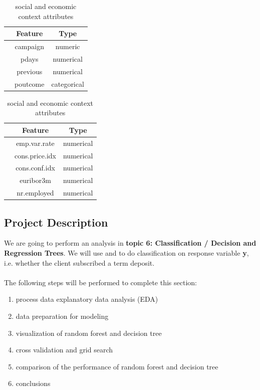 \documentclass[11pt,a4paper]{article}
\newcounter{magicrownumbers}
\newcommand\rownumber{\stepcounter{magicrownumbers}\arabic{magicrownumbers}}
\begin{document}
    \begin{table}[h]
        \begin{minipage}{.5\linewidth}
            \centering
            \begin{tabular}{r c c}
                 & Feature & Type \\
                \hline \hline
                \rownumber & campaign & numeric \\
                \rownumber & pdays & numerical \\
                \rownumber & previous & numerical \\
                \rownumber & poutcome & categorical \\
            \end{tabular}
            \caption{Other attributes}\label{tab:other}
        \end{minipage}%
        \begin{minipage}{.5\linewidth}
            \centering
            \begin{tabular}{r c c}
                 & Feature & Type \\
                \hline \hline
                \rownumber & emp.var.rate & numerical \\
                \rownumber & cons.price.idx & numerical \\
                \rownumber & cons.conf.idx & numerical \\
                \rownumber & euribor3m & numerical \\
                \rownumber & nr.employed & numerical \\
            \end{tabular}
            \caption{social and economic context attributes}\label{tab:soc.econ}
        \end{minipage}
    \end{table}
    
    \subsection{Project Description}
    We are going to perform an analysis in \textbf{topic 6: Classification / Decision and Regression Trees}. We will use  and  to do classification on response variable \textbf{y}, i.e. whether the client subscribed a term deposit. \\
    \\
    The following steps will be performed to complete this section:
    \begin{enumerate}
        \item process data explanatory data analysis (EDA)
        \item data preparation for modeling
        \item visualization of random forest and decision tree
        \item cross validation and grid search
        \item comparison of the performance of random forest and decision tree
        \item conclusions
    \end{enumerate}
    
\end{document}
